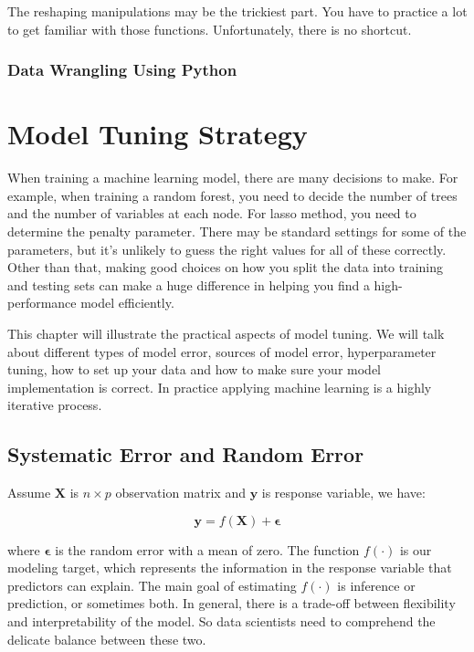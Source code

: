 \documentclass[12pt,]{krantz}
\theoremstyle{definition}
\theoremstyle{definition}
\theoremstyle{definition}
\theoremstyle{remark}
\begin{document}
The reshaping manipulations may be the trickiest part. You have to
practice a lot to get familiar with those functions. Unfortunately,
there is no shortcut.

\subsection{Data Wrangling Using
Python}\label{data-wrangling-using-python}

\chapter{Model Tuning Strategy}\label{model-tuning-strategy}

When training a machine learning model, there are many decisions to
make. For example, when training a random forest, you need to decide the
number of trees and the number of variables at each node. For lasso
method, you need to determine the penalty parameter. There may be
standard settings for some of the parameters, but it's unlikely to guess
the right values for all of these correctly. Other than that, making
good choices on how you split the data into training and testing sets
can make a huge difference in helping you find a high-performance model
efficiently.

This chapter will illustrate the practical aspects of model tuning. We
will talk about different types of model error, sources of model error,
hyperparameter tuning, how to set up your data and how to make sure your
model implementation is correct. In practice applying machine learning
is a highly iterative process.

\section{Systematic Error and Random
Error}\label{systematic-error-and-random-error}

Assume \(\mathbf{X}\) is \(n \times p\) observation matrix and
\(\mathbf{y}\) is response variable, we have:

\[\mathbf{y}=f(\mathbf{X})+\mathbf{\epsilon}\]

where \(\mathbf{\epsilon}\) is the random error with a mean of zero. The
function \(f(\cdot)\) is our modeling target, which represents the
information in the response variable that predictors can explain. The
main goal of estimating \(f(\cdot)\) is inference or prediction, or
sometimes both. In general, there is a trade-off between flexibility and
interpretability of the model. So data scientists need to comprehend the
delicate balance between these two.
\end{document}
